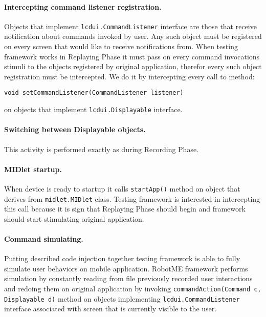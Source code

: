 \documentclass[a4paper,10pt,oneside,final]{dweiss-technote}
\begin{document}
\paragraph*{Intercepting command listener registration.} Objects that implement
\texttt{lcdui.CommandListener} interface are those that receive notification about commands invoked
by user. Any such object must be registered on every screen that would like to receive notifications
from. When testing framework works in Replaying Phase it must pass on every command invocations
stimuli to the objects registered by original application, therefor every such object registration
must be intercepted. We do it by intercepting every call to method:

\begin{Verbatim}
void setCommandListener(CommandListener listener)
\end{Verbatim}

\noindent%
on objects that implement \texttt{lcdui.Displayable} interface.

\paragraph*{Switching between Displayable objects.}
This activity is performed exactly as during Recording Phase.

\paragraph*{MIDlet startup.} When device is ready to startup it calls \texttt{startApp()} method on
object that derives from \texttt{midlet.MIDlet} class. Testing framework is interested in
intercepting this call because it is sign that Replaying Phase should begin and framework should
start stimulating original application.

\paragraph*{Command simulating.} Putting described code injection together testing framework is able
to fully simulate user behaviors on mobile application. RobotME framework performs simulation by
constantly reading from file previously recorded user interactions and redoing them on original
application by invoking \texttt{commandAction(Command c, Displayable d)} method on objects
implementing \texttt{lcdui.CommandListener} interface associated with screen that is currently
visible to the user.
\end{document}
